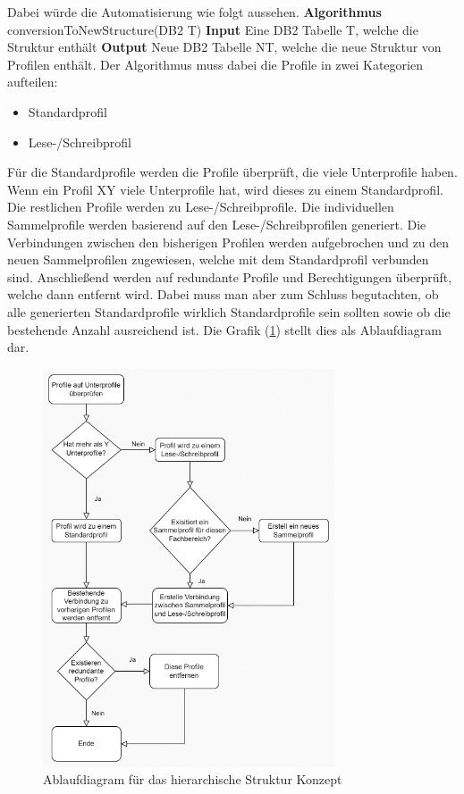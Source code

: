 Dabei würde die Automatisierung wie folgt aussehen.
\newline
\newline
\textbf{Algorithmus} conversionToNewStructure(DB$2$ T)
\newline
\newline
\textbf{Input} Eine DB2 Tabelle T, welche die Struktur enthält
\newline
\newline
\textbf{Output} Neue DB2 Tabelle NT, welche die neue Struktur von Profilen enthält.
\newline
\newline
Der Algorithmus muss dabei die Profile in zwei Kategorien aufteilen:
\begin{itemize}
	\item Standardprofil
	\item Lese-/Schreibprofil
\end{itemize}
Für die Standardprofile werden die Profile überprüft, die viele Unterprofile haben.
Wenn ein Profil XY viele Unterprofile hat, wird dieses zu einem Standardprofil.
Die restlichen Profile werden zu Lese-/Schreibprofile.
Die individuellen Sammelprofile werden basierend auf den Lese-/Schreibprofilen generiert.
Die Verbindungen zwischen den bisherigen Profilen werden aufgebrochen und zu den neuen Sammelprofilen zugewiesen, welche mit dem Standardprofil verbunden sind.
Anschließend werden auf redundante Profile und Berechtigungen überprüft, welche dann entfernt wird.
Dabei muss man aber zum Schluss begutachten, ob alle generierten Standardprofile wirklich Standardprofile sein sollten sowie ob die bestehende Anzahl ausreichend ist.
Die Grafik (\ref{fig:Hier}) stellt dies als Ablaufdiagram dar.
\begin{figure}[h!]
 \centering
 \includegraphics[width=0.77\textwidth]{gfx/Picture/Hier.PNG}
 \caption{Ablaufdiagram für das hierarchische Struktur Konzept}
 \label{fig:Hier}
\end{figure}
\newpage
